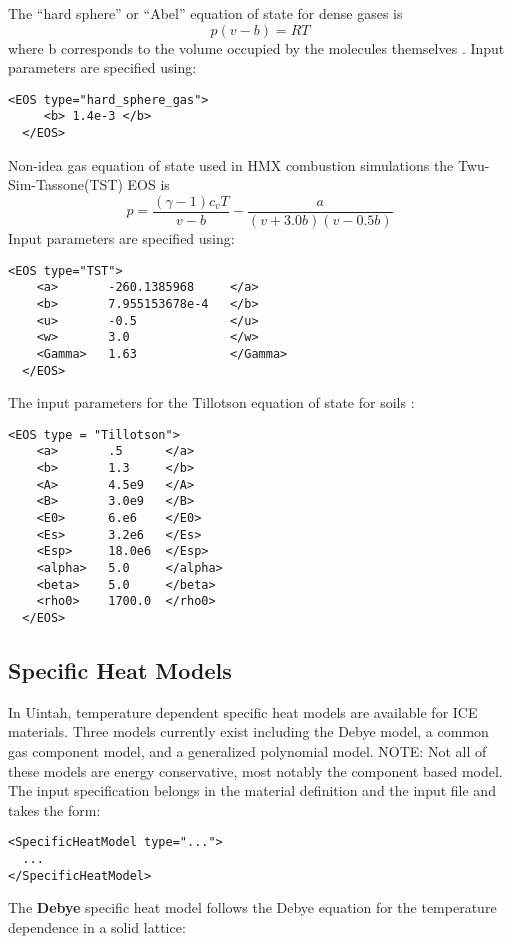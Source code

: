 %
The ``hard sphere'' or ``Abel'' equation of state for dense gases is
%
\begin{equation}
  p(v - b) = RT
\end{equation}
%
where b corresponds to the volume occupied by the molecules themselves \cite{ref:thompson}.  Input parameters are specified using:
%
\begin{Verbatim}[fontsize=\footnotesize]
  <EOS type="hard_sphere_gas">
     <b> 1.4e-3 </b>
  </EOS>
\end{Verbatim}
%
%
Non-idea gas equation of state used in HMX combustion simulations the Twu-Sim-Tassone(TST) EOS is
%
\begin{equation}
  p = \frac{ (\gamma -1)c_v T }{ v - b} - \frac{ a }{(v+3.0b)(v-0.5b)}
\end{equation}
%
Input parameters are specified using:
%
\begin{Verbatim}[fontsize=\footnotesize]
  <EOS type="TST">
    <a>       -260.1385968     </a>
    <b>       7.955153678e-4   </b>
    <u>       -0.5             </u>
    <w>       3.0              </w>
    <Gamma>   1.63             </Gamma>
  </EOS>
\end{Verbatim}
%
%
The input parameters for the Tillotson equation of state \cite{ref:gathers} for soils :
%
\begin{Verbatim}[fontsize=\footnotesize]
  <EOS type = "Tillotson">
    <a>       .5      </a>
    <b>       1.3     </b>
    <A>       4.5e9   </A>
    <B>       3.0e9   </B>
    <E0>      6.e6    </E0>
    <Es>      3.2e6   </Es>
    <Esp>     18.0e6  </Esp>
    <alpha>   5.0     </alpha>
    <beta>    5.0     </beta>
    <rho0>    1700.0  </rho0>
  </EOS>
\end{Verbatim}

%
\subsection{Specific Heat Models}
In Uintah, temperature dependent specific heat models are available for ICE materials.  Three models currently exist including the Debye model, a common gas component model, and a generalized polynomial model.  NOTE: Not all of these models are energy conservative, most notably the component based model.  The input specification belongs in the material definition and the input file and takes the form:
%
\begin{Verbatim}[fontsize=\footnotesize]
<SpecificHeatModel type="...">
  ...
</SpecificHeatModel>
\end{Verbatim}
%
The \textbf{Debye} specific heat model follows the Debye equation for the temperature dependence in a solid lattice:
\\

